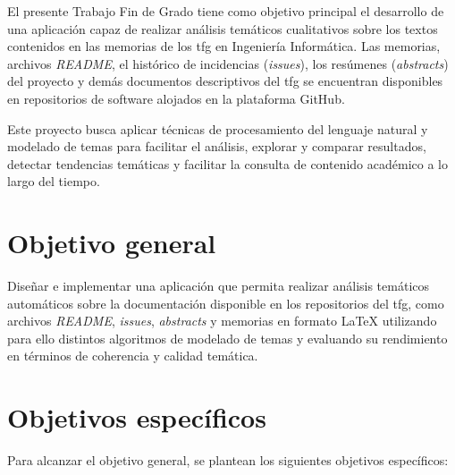 
El presente Trabajo Fin de Grado tiene como objetivo principal el desarrollo de
una aplicación capaz de realizar análisis temáticos cualitativos sobre los
textos contenidos en las memorias de los \acrfull{tfg} en Ingeniería
Informática. Las memorias, archivos \textit{README}, el histórico de
incidencias (\textit{issues}), los resúmenes (\textit{abstracts}) del proyecto
y demás documentos descriptivos del \acrshort{tfg} se encuentran disponibles en
repositorios de software alojados en la plataforma GitHub.

Este proyecto busca aplicar técnicas de procesamiento del lenguaje natural y
modelado de temas para facilitar el análisis, explorar y comparar resultados,
detectar tendencias temáticas y facilitar la consulta de contenido académico a
lo largo del tiempo.

\section{Objetivo general}

Diseñar e implementar una aplicación que permita realizar análisis temáticos
automáticos sobre la documentación disponible en los repositorios del
\acrshort{tfg}, como archivos \textit{README}, \textit{issues},
\textit{abstracts} y memorias en formato \LaTeX{} utilizando para ello
distintos algoritmos de modelado de temas y evaluando su rendimiento en
términos de coherencia y calidad temática.

\section{Objetivos específicos}

Para alcanzar el objetivo general, se plantean los siguientes objetivos
específicos:

